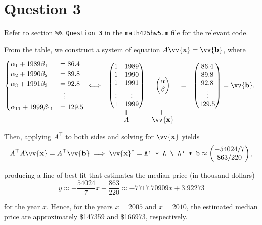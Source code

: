 \documentclass[12pt]{article}
\newcommand{\veq}{\mathrel{\rotatebox{90}{$=$}}}
\newcommand{\vect}[1]{\vv{\mathbf{#1}}}
\newcommand{\code}[1]{\texttt{#1}}
\begin{document}
\section*{Question 3}

Refer to section \code{\%\% Question 3} in the \code{math425hw5.m} file for the relevant code.

From the table, we construct a system of equation $A\vect{x}=\vect{b}$, where
$$
\begin{cases}
    \alpha_1 + 1989\beta_1 &= 86.4 \\
    \alpha_2 + 1990\beta_2 &= 89.8 \\
    \alpha_3 + 1991\beta_3 &= 92.8 \\
    &\vdotswithin{=} \\
    \alpha_{11} + 1999\beta_{11} &= 129.5 \\
\end{cases}
\iff
\begin{array}[t]{cccc}
\begin{pmatrix}
    1 & 1989 \\
    1 & 1990 \\
    1 & 1991 \\
    \vdots & \vdots\\
    1 & 1999
\end{pmatrix}
&
\begin{pmatrix}
    \alpha \\ \beta
\end{pmatrix}
&
=
&
\begin{pmatrix}
    86.4 \\
    89.8 \\
    92.8 \\
    \vdots \\
    129.5
\end{pmatrix}
=\vect{b}.
\\
\overset{\veq}{A} & \overset{\veq}{\vect{x}}
\end{array}
$$

Then, applying $A^\top$ to both sides and solving for $\vect{x}$ yields
$$
A^\top A\vect{x}=A^\top\vect{b} \implies
\vect{x}^* = \verb|A' * A \ A' * b| \approx
\begin{pmatrix}
    -54024/7   \\  
     863/220  \\
\end{pmatrix},
$$

producing a line of best fit that estimates the median price (in thousand dollars)
$$
y \approx -\frac{54024}{7}x + \frac{863}{220} \approx -7717.70909x + 3.92273
$$

for the year $x$. Hence, for the years $x=2005$ and $x=2010$, the estimated median price are approximately \$147359 and \$166973, respectively.
\end{document}
